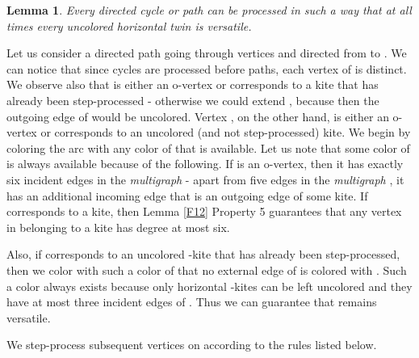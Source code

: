 \documentclass[a4, 11pt]{article}
\newcommand{\dowod}{\noindent{\bf Proof.~}}
\newcommand{\<}{\langle}
\renewcommand{\>}{\rangle}
\newtheorem{lemma}{Lemma}
\begin{document}
\begin{lemma} Every  directed cycle or path can be processed in such a way that at all times every uncolored horizontal twin is versatile.
\end{lemma} 
\dowod
Let us consider a directed path  going through vertices  and directed from  to . 
We can notice that since cycles are processed before paths, each vertex of  is distinct.
We observe also that  is either an o-vertex or corresponds to a kite that has already been step-processed - otherwise we could extend , because then the outgoing edge of  would be uncolored.  Vertex , on the other hand, is either an o-vertex or corresponds to an uncolored (and not step-processed) kite. We begin by  coloring the arc  with any color of  that is available. 
Let us note that some color of  is always available because of the following.  If  is an o-vertex, then it has exactly six incident edges in the {\em multigraph}  - apart from five edges in the {\em multigraph} , it  has an additional incoming edge that is an outgoing edge of some kite. If  corresponds to a kite, then  Lemma \ref{F12} Property 5 guarantees that any vertex in  belonging to a kite has degree at most six.

 Also, if  corresponds to an uncolored -kite  that has already been step-processed, then we color  with such a color  of  that no external edge of  is colored with .  Such a color  always exists because only horizontal -kites can be left uncolored and they have at most three incident edges of . Thus we can guarantee that  remains versatile.

We step-process subsequent vertices on  according to the rules listed below. 
 
\end{document}
